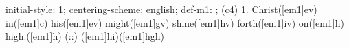 initial-style: 1;
centering-scheme: english;
def-m1: \grealign;
(c4) 1. Christ([em1]ev) in([em1]c) his([em1]ev) might([em1]gv) shine([em1]hv) forth([em1]iv) on([em1]h) high.([em1]h) (::) ([em1]hi)([em1]hgh)